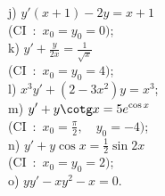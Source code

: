 \documentclass[12pt,french,oneside,a4paper]{memoir} %
\begin{document}
\begin{exo}
\begin{minipage}[t]{6cm}
\end{minipage}
\hfill
\begin{minipage}[t]{6cm}
j) $\displaystyle{y'(x+1)-2y=x+1}$\\[2mm]
\hspace*{5mm}(\mbox{CI : }$x_0=y_0=0)$;\\[2mm]
k) $\displaystyle{y'+\frac{y}{2x}=\frac{1}{\sqrt x}}$\\[2mm]
\hspace*{5mm}(\mbox{CI : }$x_0=y_0=4)$;\\[2mm]
l) $\displaystyle{x^3y'+(2-3x^2)y=x^3}$;\\[2mm]
m) $\displaystyle{y'+y\cotg x=5e^{\cos x}}$\\ 
\hspace*{5mm}(\mbox{CI : }$x_0=\frac{\pi}{2},\quad
y_0=-4)$;\\[2mm] 
n) $\displaystyle{y'+y\cos x=\frac{1}{2}\sin 2x}$\\
\hspace*{5mm}(\mbox{CI : }$x_0=y_0=2)$;\\[2mm]
o) $\displaystyle{yy'-xy^2-x=0}$.
\end{minipage} \hfill
\end{exo}
\end{document}
